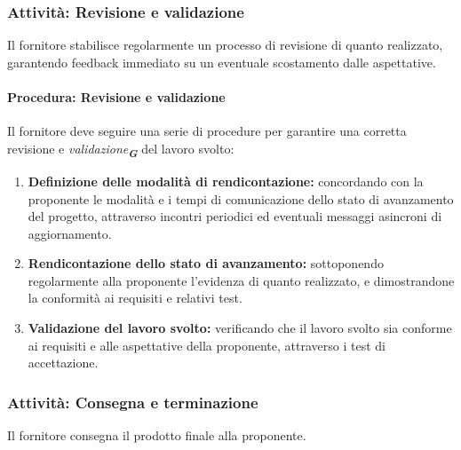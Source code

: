 \documentclass[a4paper,12pt]{article}
\newcommand{\glossario}[1]{\textit{#1}\textsubscript{\textbf{\textit{\textcolor{lightblack}{G}}}}}
\begin{document}
\subsubsection{Attività: Revisione e validazione}
Il fornitore stabilisce regolarmente un processo di revisione di quanto realizzato, garantendo feedback immediato su un eventuale scostamento dalle aspettative.

\paragraph{Procedura: Revisione e validazione}
Il fornitore deve seguire una serie di procedure per garantire una corretta revisione e \glossario{validazione} del lavoro svolto:
\begin{enumerate}
    \item \textbf{Definizione delle modalità di rendicontazione:}  concordando con la proponente le modalità e i tempi di comunicazione dello stato di avanzamento del progetto, attraverso incontri periodici ed eventuali messaggi asincroni di aggiornamento.
    \item \textbf{Rendicontazione dello stato di avanzamento:} sottoponendo regolarmente alla proponente l'evidenza di quanto realizzato, e dimostrandone la conformità ai requisiti e relativi test.
    \item \textbf{Validazione del lavoro svolto:} verificando che il lavoro svolto sia conforme ai requisiti e alle aspettative della proponente, attraverso i test di accettazione.
\end{enumerate}

\subsubsection{Attività: Consegna e terminazione}
Il fornitore consegna il prodotto finale alla proponente.
\end{document}
